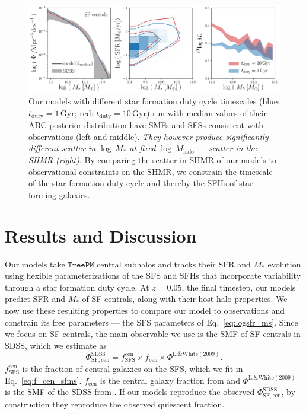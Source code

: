 \documentclass[12pt, letterpaper, preprint, tighten]{aastex62}
\newcommand{\beq}{\begin{equation}}
\newcommand{\eeq}{\end{equation}}
\begin{document}
\begin{figure}
\begin{center}
\includegraphics[width=\textwidth]{figs/qaplot_abc.pdf}
    \caption{Our models with different star formation duty cycle timescales 
    (blue: $t_\mathrm{duty}{=}1\,\mathrm{Gyr}$; red: $t_\mathrm{duty}{=}10\,\mathrm{Gyr}$) 
    run with median values of their ABC posterior distribution have SMFs and SFSs consistent 
    with observations (left and middle). \emph{They however produce significantly different 
    scatter in $\log\,M_*$ at fixed $\log\,M_\mathrm{halo}$ --- scatter in the SHMR (right)}. 
    By comparing the scatter in SHMR of our models to observational constraints on the SHMR, 
    we constrain the timescale of the star formation duty cycle and thereby the SFHs of star 
    forming galaxies.
    }
\label{fig:abc_demo}
\end{center}
\end{figure}

\section{Results and Discussion} \label{sec:results} 
Our models take $\mathtt{TreePM}$ central subhalos and tracks their SFR 
and $M_*$ evolution using flexible parameterizations of the SFS and SFHs 
that incorporate variability through a star formation duty cycle.
At $z = 0.05$, the final timestep, our models predict SFR and $M_*$ of SF 
centrals, along with their host halo properties. We now use these resulting 
properties to compare our model to observations and constrain its free 
parameters --- the SFS parameters of Eq.~\ref{eq:logsfr_ms}. Since we focus 
on SF centrals, the main observable we use is the SMF of SF centrals in 
SDSS, which we estimate as 
\beq \label{eq:smf_sf_cen} 
\Phi^\mathrm{SDSS}_\mathrm{SF,cen} = f^\mathrm{cen}_\mathrm{SFS} \times f_\mathrm{cen} \times \Phi^\mathrm{Li\&White(2009)}.
\eeq
$f^\mathrm{cen}_\mathrm{SFS}$ is the fraction of central galaxies on the 
SFS, which we fit in Eq.~\ref{eq:f_cen_sfms}. $f_\mathrm{cen}$ is the 
central galaxy fraction from \cite{wetzel2013} and $\Phi^\mathrm{Li\&White(2009)}$ 
is the SMF of the SDSS from \cite{li2009}. If our models reproduce the 
observed $\Phi^\mathrm{SDSS}_\mathrm{SF,cen}$, by construction they reproduce 
the observed quiescent fraction. 
\end{document}
